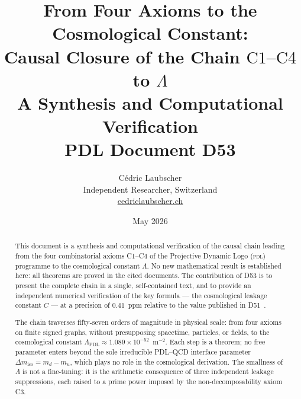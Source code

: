 \documentclass[12pt,a4paper]{article}
\theoremstyle{plain}
\theoremstyle{definition}
\theoremstyle{remark}
\newcommand{\PDL}{\textsc{pdl}}
\begin{document}
\title{\textbf{From Four Axioms to the Cosmological Constant:\\
Causal Closure of the Chain $\mathrm{C1}$--$\mathrm{C4}$ to $\Lambda$}\\[6pt]
{\large A Synthesis and Computational Verification}\\[4pt]
{\large PDL Document D53}}

\author{C\'edric Laubscher\\[4pt]
\small Independent Researcher, Switzerland\\
\small \href{https://cedriclaubscher.ch}{cedriclaubscher.ch}}

\date{May 2026}

\maketitle

\begin{abstract}
This document is a synthesis and computational verification of the causal chain leading from the four combinatorial axioms C1--C4 of the Projective Dynamic Logo (\PDL) programme to the cosmological constant $\Lambda$. No new mathematical result is established here: all theorems are proved in the cited documents. The contribution of D53 is to present the complete chain in a single, self-contained text, and to provide an independent numerical verification of the key formula — the cosmological leakage constant $C$ — at a precision of $0.41$~ppm relative to the value published in D51~\cite{PDL_D51_2026}.

The chain traverses fifty-seven orders of magnitude in physical scale: from four axioms on finite signed graphs, without presupposing spacetime, particles, or fields, to the cosmological constant $\Lambda_{\mathrm{PDL}} \approx 1.089 \times 10^{-52}$~m$^{-2}$. Each step is a theorem; no free parameter enters beyond the sole irreducible PDL--QCD interface parameter $\Delta m_{\mathrm{iso}} = m_d - m_u$, which plays no role in the cosmological derivation. The smallness of $\Lambda$ is not a fine-tuning: it is the arithmetic consequence of three independent leakage suppressions, each raised to a prime power imposed by the non-decomposability axiom C3.
\end{abstract}

\clearpage

\tableofcontents
\newpage

\end{document}
